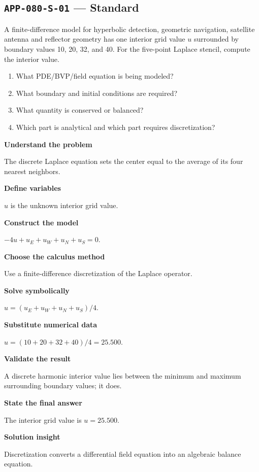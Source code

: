 \documentclass[11pt]{book}
\newcommand{\pid}[1]{\texttt{#1}}
\begin{document}
\subsection*{\pid{APP-080-S-01} — Standard}
\begin{problembox}
A finite-difference model for hyperbolic detection, geometric navigation, satellite antenna and reflector geometry has one interior grid value $u$ surrounded by boundary values 10, 20, 32, and 40. For the five-point Laplace stencil, compute the interior value.
\end{problembox}
\begin{promptbox}\begin{enumerate}
\item What PDE/BVP/field equation is being modeled?
\item What boundary and initial conditions are required?
\item What quantity is conserved or balanced?
\item Which part is analytical and which part requires discretization?
\end{enumerate}\end{promptbox}
\begin{solutionbox}
\textbf{Understand the problem}\par The discrete Laplace equation sets the center equal to the average of its four nearest neighbors.\par\medskip
\textbf{Define variables}\par $u$ is the unknown interior grid value.\par\medskip
\textbf{Construct the model}\par $-4u+u_E+u_W+u_N+u_S=0$.\par\medskip
\textbf{Choose the calculus method}\par Use a finite-difference discretization of the Laplace operator.\par\medskip
\textbf{Solve symbolically}\par $u=(u_E+u_W+u_N+u_S)/4$.\par\medskip
\textbf{Substitute numerical data}\par $u=(10+20+32+40)/4=25.500$.\par\medskip
\textbf{Validate the result}\par A discrete harmonic interior value lies between the minimum and maximum surrounding boundary values; it does.\par\medskip
\textbf{State the final answer}\par The interior grid value is $u=25.500$.\par\medskip
\textbf{Solution insight}\par Discretization converts a differential field equation into an algebraic balance equation.\par\medskip
\end{solutionbox}
\end{document}
